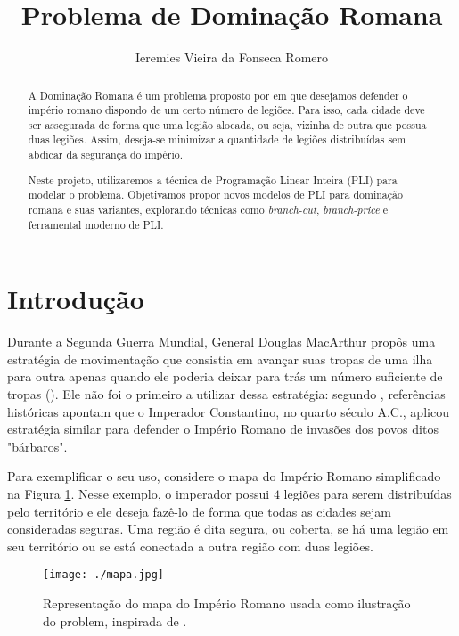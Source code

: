 \documentclass[11pt]{article}
\author{Ieremies Vieira da Fonseca Romero}
\date{}
\title{Problema de Dominação Romana}
\begin{document}
\maketitle
\begin{abstract}
A Dominação Romana é um problema proposto por \textcite{Stewart1999DefendRomanEmpire} em que desejamos defender o império romano dispondo de um certo número de legiões.
Para isso, cada cidade deve ser assegurada de forma que uma legião alocada, ou seja, vizinha de outra que possua duas legiões.
Assim, deseja-se minimizar a quantidade de legiões distribuídas sem abdicar da segurança do império.

Neste projeto, utilizaremos a técnica de Programação Linear Inteira (PLI) para modelar o problema.
Objetivamos propor novos modelos de PLI para dominação romana e suas variantes, explorando técnicas como \emph{branch-cut}, \emph{branch-price} e ferramental moderno de PLI.
\end{abstract}

\section{Introdução}
\label{sec:org65b1d29}
Durante a Segunda Guerra Mundial, General Douglas MacArthur propôs uma estratégia de movimentação que consistia em avançar suas tropas de uma ilha para outra apenas quando ele poderia deixar para trás um número suficiente de tropas (\autocite{Stewart1999DefendRomanEmpire}).
Ele não foi o primeiro a utilizar dessa estratégia: segundo \textcite{Stewart1999DefendRomanEmpire}, referências históricas apontam que o Imperador Constantino, no quarto século A.C., aplicou estratégia similar para defender o Império Romano de invasões dos povos ditos "bárbaros".

Para exemplificar o seu uso, considere o mapa do Império Romano simplificado na Figura \ref{fig:mapa}.
Nesse exemplo, o imperador possui \(4\) legiões para serem distribuídas pelo território e ele deseja fazê-lo de forma que todas as cidades sejam consideradas seguras.
Uma região é dita segura, ou coberta, se há uma legião em seu território ou se está conectada a outra região com duas legiões.

\begin{figure}[htbp]
\centering
\texttt{[image: ./mapa.jpg]}
\caption{\label{fig:mapa}Representação do mapa do Império Romano usada como ilustração do problem, inspirada de \textcite{Stewart1999DefendRomanEmpire}.}
\end{figure}
\end{document}

